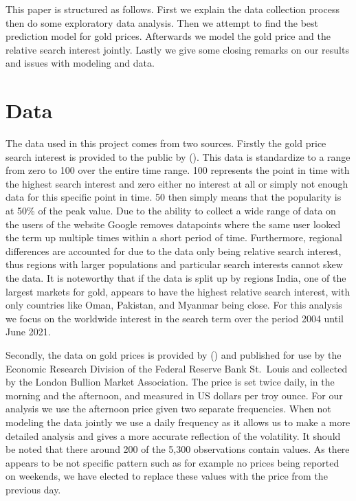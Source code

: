 \documentclass[a4paper]{article}
\theoremstyle{definition}
\begin{document}
This paper is structured as follows. First we explain the data collection process then do some exploratory data analysis. Then we attempt to find the best prediction model for gold prices. Afterwards we model the gold price and the relative search interest jointly. Lastly we give some closing remarks on our results and issues with modeling and data.
\section{Data}
The data used in this project comes from two sources. Firstly the gold price search interest is provided to the public by \citeauthor{Google.2021} (\citeyear{Google.2021}). This data is standardize to a range from zero to 100 over the entire time range. 100 represents the point in time with the highest search interest and zero either no interest at all or simply not enough data for this specific point in time. 50 then simply means that the popularity is at 50\% of the peak value. Due to the ability to collect a wide range of data on the users of the website Google removes datapoints where the same user looked the term up multiple times within a short period of time. Furthermore, regional differences  are accounted for due to the data only being relative search interest, thus regions with larger populations and particular search interests cannot skew the data. It is noteworthy that if the data is split up by regions India, one of the largest markets for gold, appears to have the highest relative search interest, with only countries like Oman, Pakistan, and Myanmar being close. For this analysis we focus on the worldwide interest in the search term  over the period 2004 until June 2021.

Secondly, the data on gold prices is provided by \citeauthor{ICEBenchmarkAdministrationLimited.} (\citeyear{ICEBenchmarkAdministrationLimited.}) and published for use by the Economic Research Division of the Federal Reserve Bank St.\ Louis and collected by the London Bullion Market Association. The price is set twice daily, in the morning and the afternoon, and measured in US dollars per troy ounce. For our analysis we use the afternoon price given two separate frequencies. When not modeling the data jointly we use a daily frequency as it allows us to make a more detailed analysis and gives a more accurate reflection of the volatility. It should be noted that there around 200 of the 5,300 observations contain  values. As there appears to be not specific pattern such as for example no prices being reported on weekends, we have elected to replace these values with the price from the previous day.  
\end{document}
